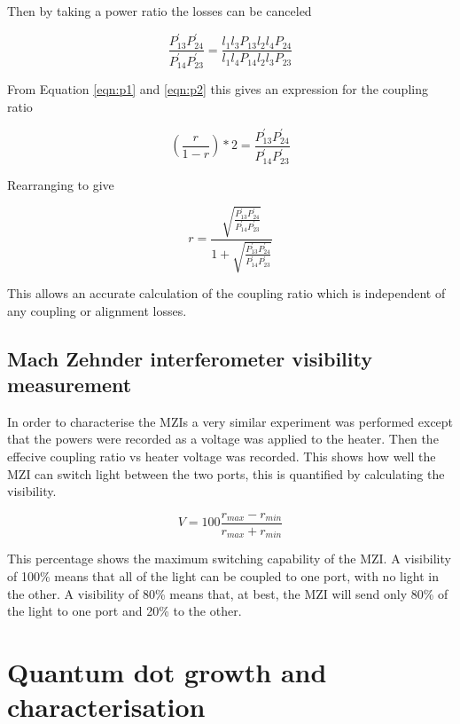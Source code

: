Then by taking a power ratio the losses can be canceled

\begin{equation} \frac{ P^{'}_{13} P^{'}_{24} }{ P^{'}_{14} P^{'}_{23} } =
\frac{ l_1 l_3 P_{13} l_2 l_4 P_{24} }{ l_1l_4P_{14}l_2l_3P_{23} }
\end{equation}

From Equation \ref{eqn:p1} and \ref{eqn:p2} this gives an expression for the
coupling ratio

\begin{equation} \left(\frac{r}{1-r}\right)*2 = \frac{P^{'}_{13}
P^{'}_{24}}{P^{'}_{14} P^{'}_{23}} \end{equation}

Rearranging to give

\begin{equation} r = \frac{\sqrt{\frac{P^{'}_{13} P^{'}_{24}}{P^{'}_{14}
P^{'}_{23}}}}{1+ \sqrt{\frac{P^{'}_{13} P^{'}_{24}}{P^{'}_{14} P^{'}_{23}}}}
\end{equation}

This allows an accurate calculation of the coupling ratio which is independent
of any coupling or alignment losses.

\subsection{Mach Zehnder interferometer visibility measurement}

In order to characterise the MZIs a very similar experiment was performed except
that the powers were recorded as a voltage was applied to the heater. Then the
effecive coupling ratio vs heater voltage was recorded. This shows how well the MZI can
switch light between the two ports, this is quantified by calculating the
visibility.

\begin{equation} V = 100 \frac{r_{max} - r_{min}}{r_{max} + r_{min}}
\end{equation}

This percentage shows the maximum switching capability of the MZI. A visibility
of 100\% means that all of the light can be coupled to one port, with no light
in the other. A visibility of 80\% means that, at best, the MZI will send only
80\% of the light to one port and 20\% to the other.

\section{Quantum dot growth and characterisation}

